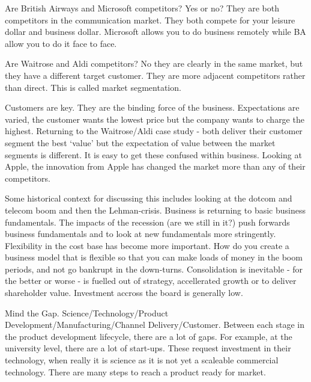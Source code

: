 Are British Airways and Microsoft competitors? Yes or no? They are both competitors in the communication market. They both compete for your leisure dollar and business dollar. Microsoft allows you to do business remotely while BA allow you to do it face to face.

Are Waitrose and Aldi competitors? No they are clearly in the same market, but they have a different target customer. They are more adjacent competitors rather than direct. This is called market segmentation. 

Customers are key. They are the binding force of the business. Expectations are varied, the customer wants the lowest price but the company wants to charge the highest. Returning to the Waitrose/Aldi case study - both deliver their customer segment the best `value' but the expectation of value between the market segments is different. It is easy to get these confused within business. Looking at Apple, the innovation from Apple has changed the market more than any of their competitors.

Some historical context for discussing this includes looking at the dotcom and telecom boom and then the Lehman-crisis. Business is returning to basic business fundamentals. The impacts of the recession (are we still in it?) push forwards business fundamentals and to look at new fundamentals more stringently. Flexibility in the cost base has become more important. How do you create a business model that is flexible so that you can make loads of money in the boom periods, and not go bankrupt in the down-turns. Consolidation is inevitable - for the better or worse - is fuelled out of strategy, accellerated growth or to deliver shareholder value. Investment accross the board is generally low.

Mind the Gap. Science/Technology/Product Development/Manufacturing/Channel Delivery/Customer. Between each stage in the product development lifecycle, there are a lot of gaps. For example, at the university level, there are a lot of start-ups. These request investment in their technology, when really it is science as it is not yet a scaleable commercial technology. There are many steps to reach a product ready for market. 

